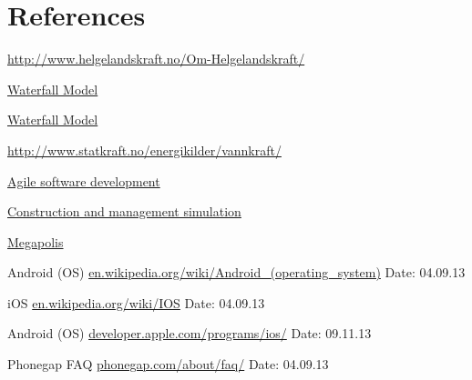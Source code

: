 \chapter{References}

\begin{thebibliography}{99}


	\href {http://www.helgelandskraft.no/Om-Helgelandskraft/}{http://www.helgelandskraft.no/Om-Helgelandskraft/}

	\href {http://en.wikipedia.org/wiki/Waterfall_model}{Waterfall Model}

	\href {http://searchsoftwarequality.techtarget.com/definition/waterfall-model}{Waterfall Model}

	\href {http://www.statkraft.no/energikilder/vannkraft/}{http://www.statkraft.no/energikilder/vannkraft/}

	\href {http://en.wikipedia.org/wiki/Agile_software_development}{Agile software development}

	\href {http://en.wikipedia.org/wiki/Construction_and_management_simulation}{Construction and management simulation}

	\href {https://play.google.com/store/apps/details?id=com.socialquantum.acityint}{Megapolis}

	Android (OS)\newline
	\href {http://en.wikipedia.org/wiki/Android\_(operating_system)}{en.wikipedia.org/wiki/Android\_(operating\_system)}\newline
	Date: 04.09.13

	iOS\newline
	\href {http://en.wikipedia.org/wiki/IOS}{en.wikipedia.org/wiki/IOS}\newline
	Date: 04.09.13

	Android (OS)\newline
	\href {https://developer.apple.com/programs/ios/}{developer.apple.com/programs/ios/}\newline
	Date: 09.11.13

	Phonegap FAQ\newline
	\href {http://phonegap.com/about/faq/}{phonegap.com/about/faq/}\newline
	Date: 04.09.13


\end{thebibliography}
